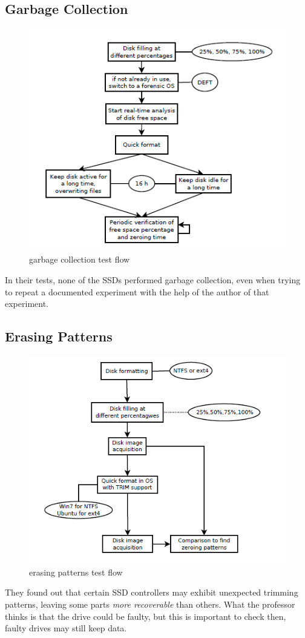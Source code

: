     \subsection{Garbage Collection}
        \begin{figure}[ht!]
            \centering
            \includegraphics[width=0.8\linewidth]{garbage.png}
            \caption{garbage collection test flow}
        \end{figure}
        In their tests, none of the SSDs performed garbage collection, even when trying to repeat a documented experiment with the help of the author of that experiment.
    \subsection{Erasing Patterns}
        \begin{figure}[ht!]
            \centering
            \includegraphics[width=0.8\linewidth]{patterns.png}
            \caption{erasing patterns test flow}
        \end{figure}
        They found out that certain SSD controllers may exhibit unexpected trimming patterns, leaving some parts \textit{more recoverable} than others. What the professor thinks is that the drive could be faulty, but this is important to check then, faulty drives may still keep data.
